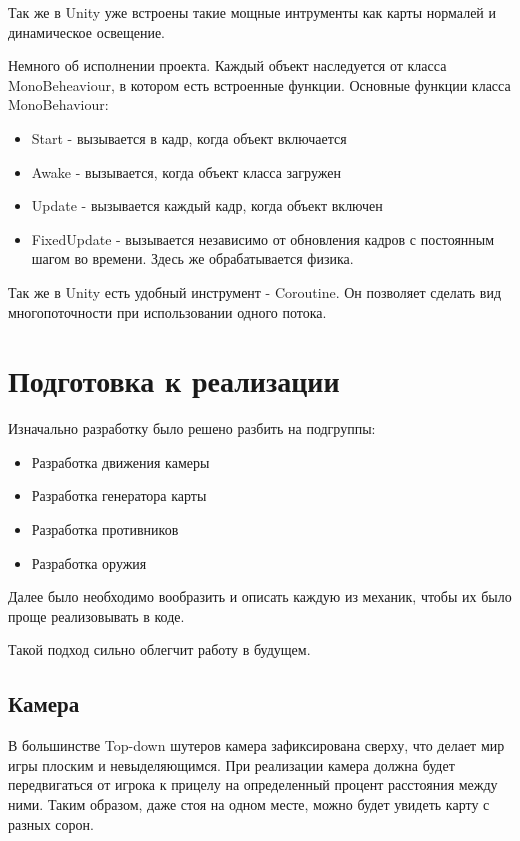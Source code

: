 \documentclass[14pt, titlepage,fleqn,a4paper]{extarticle}
\begin{document}
Так же в Unity уже встроены такие мощные интрументы как карты нормалей и динамическое освещение.

Немного об исполнении проекта.
Каждый объект наследуется от класса MonoBeheaviour, в котором есть встроенные функции.
	Основные функции класса MonoBehaviour:
	\begin{itemize}
	\item Start - вызывается в кадр, когда объект включается 
	\item Awake - вызывается, когда объект класса загружен
	\item Update - вызывается каждый кадр, когда объект включен
	\item FixedUpdate - вызывается независимо от обновления кадров с постоянным шагом во времени. Здесь же обрабатывается физика.
    \end{itemize}
Так же в Unity есть удобный инструмент - Coroutine. Он позволяет сделать вид многопоточности при использовании одного потока.

\newpage
    \section*{Подготовка к реализации}
	
	Изначально разработку было решено разбить на подгруппы:
	\begin{itemize}
	\item Разработка движения камеры
	\item Разработка генератора карты
	\item Разработка противников
	\item Разработка оружия
	\end{itemize}
	
	Далее было необходимо вообразить и описать каждую из механик, чтобы их было проще реализовывать в коде.
	
	Такой подход сильно облегчит работу в будущем.
	
	\subsection*{Камера}
	
	В большинстве Top-down шутеров камера зафиксирована сверху, что делает мир игры плоским и невыделяющимся. При реализации камера должна будет передвигаться от игрока к прицелу на определенный процент расстояния между ними. Таким образом, даже стоя на одном месте, можно будет увидеть карту с разных сорон.
	
\end{document}
